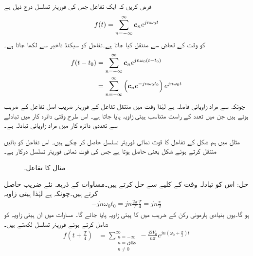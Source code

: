 فرض کریں کہ ایک تفاعل جس کی فوریئر تسلسل درج ذیل ہے
\begin{align}
f(t)=\sum_{n=-\infty}^{\infty} {{\boldsymbol{c}}}_n e^{jn\omega_0 t}
\end{align}
کو وقت کے لحاض سے منتقل کیا جاتا ہے۔تفاعل  کو  سیکنڈ تاخیر سے   لکھا جاتا ہے۔
\begin{gather}
\begin{aligned}\label{مساوات_فوریئر_تبادلہ_وقت}
f(t-t_0)&=\sum_{n=-\infty}^{\infty} {{\boldsymbol{c}}}_n e^{jn\omega_0 (t-t_0)}\\
&=\sum_{n=-\infty}^{\infty} \left({{\boldsymbol{c}}}_n e^{-jn\omega_0 t_0}\right) e^{jn\omega_0 t}
\end{aligned}
\end{gather}
چونکہ  سے مراد زاویائی فاصلہ ہے لہٰذا وقت میں منتقل تفاعل  کے فوریئر  ضریب  اصل تفاعل  کے  ضریب  ہوتے ہیں جن میں تعدد کے راست متناسب ہیتی زاویہ    پایا جاتا ہے۔ اس طرح وقتی دائرہ کار میں تبادلے سے  تعددی دائرہ کار میں مراد  زاویائی تبادلہ ہے۔

مثال  میں ہم شکل  کے تفاعل  کا قوت نمائی فوریئر تسلسل حاصل کر چکے ہیں۔ اس تفاعل کو  بائیں منتقل کرتے ہوئے شکل  یعنی  حاصل ہوتا ہے جس کی قوت نمائی فوریئر تسلسل درکار ہے۔
\begin{figure}
\centering
{}
\caption{مثال  کا تفاعل۔}
\label{شکل_فوریئر_دندان_منتقل_دوبارہ}
\end{figure}%
حل: اس کو تبادلہ وقت کے کلیے سے حل کرتے ہیں۔مساوات  کے ذریعہ نئے  ضریب  حاصل کرتے ہیں۔چونکہ  ہے لہٰذا ہیتی زاویہ
\begin{align*}
-jn\omega_0 t_0=jn \frac{2\pi}{T} \frac{T}{4}=jn\frac{\pi}{2}
\end{align*}
ہو گا۔یوں بنیادی ہارمونی رکن کے  ضریب  میں  کا ہیتی زاویہ پایا جائے گا۔ مساوات  میں ان ہیتی زاویہ کو شامل کرتے ہوئے فوریئر تسلسل لکھتے ہیں۔
\begin{align}
f\left(t+\frac{T}{4}\right)&=\sum_{\substack{n=-\infty \\ n=\text{طاق}\\ n \ne 0} }^{\infty} -\frac{j2V_0}{n\pi}e^{jn\left(\omega_0 +\frac{\pi}{2}\right)t}
\end{align}

